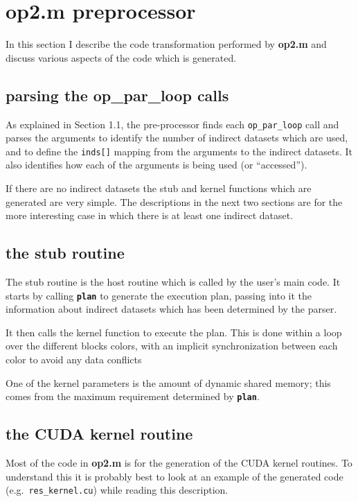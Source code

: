\documentclass[12pt]{article}
\begin{document}
\section{op2.m preprocessor}

In this section I describe the code transformation performed by
{\bf op2.m} and discuss various aspects of the code which is generated.

\subsection{parsing the op\_par\_loop calls}

As explained in Section 1.1, the pre-processor finds each 
{\tt op\_par\_loop} call 
and parses the arguments to identify the number of indirect 
datasets which are used, and to define the {\tt inds[]} mapping from 
the arguments to the indirect datasets.  It also identifies how
each of the arguments is being used (or ``accessed'').

If there are no indirect datasets the stub and kernel functions
which are generated are very simple.  The descriptions in the next 
two sections are for the more interesting case in which there is
at least one indirect dataset.

\subsection{the stub routine}

The stub routine is the host routine which is called by the 
user's main code.  It starts by calling {\tt \bf plan} to 
generate the execution plan, passing into it the information
about indirect datasets which has been determined by the parser.

It then calls the kernel function to execute the plan.  This is 
done within a loop over the different blocks colors, with an
implicit synchronization between each color to avoid any data 
conflicts

One of the kernel parameters is the amount of dynamic shared 
memory; this comes from the maximum requirement determined 
by {\tt \bf plan}.


\subsection{the CUDA kernel routine}

Most of the code in {\bf op2.m} is for the generation of the CUDA 
kernel routines.  To understand this it is probably best to look
at an example of the generated code (e.g.~{\tt res\_kernel.cu})
while reading this description.
\end{document}
